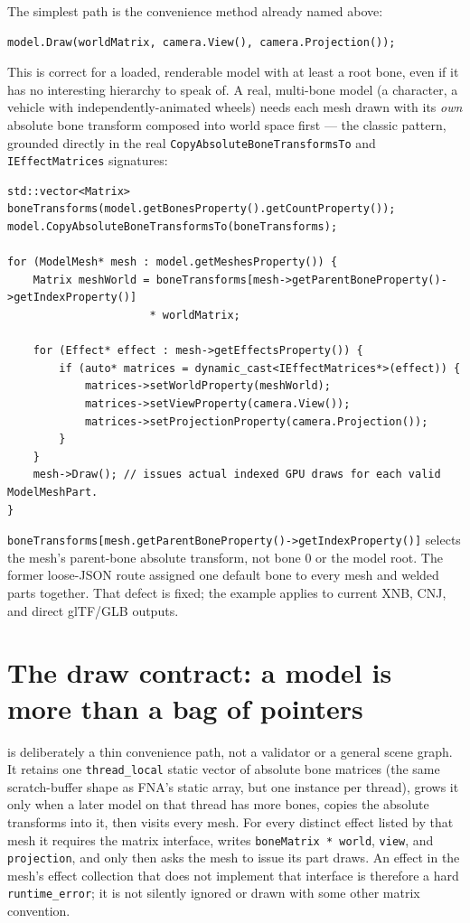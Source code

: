 The simplest path is the convenience method already named above:

\begin{lstlisting}
model.Draw(worldMatrix, camera.View(), camera.Projection());
\end{lstlisting}

This is correct for a loaded, renderable model with at least a root bone, even if it has no
interesting hierarchy to speak of. A real, multi-bone model
(a character, a vehicle with independently-animated wheels) needs each mesh drawn with its
\emph{own} absolute bone transform composed into world space first --- the classic pattern,
grounded directly in the real \texttt{CopyAbsoluteBoneTransformsTo} and
\texttt{IEffectMatrices} signatures:

\begin{lstlisting}
std::vector<Matrix> boneTransforms(model.getBonesProperty().getCountProperty());
model.CopyAbsoluteBoneTransformsTo(boneTransforms);

for (ModelMesh* mesh : model.getMeshesProperty()) {
    Matrix meshWorld = boneTransforms[mesh->getParentBoneProperty()->getIndexProperty()]
                      * worldMatrix;

    for (Effect* effect : mesh->getEffectsProperty()) {
        if (auto* matrices = dynamic_cast<IEffectMatrices*>(effect)) {
            matrices->setWorldProperty(meshWorld);
            matrices->setViewProperty(camera.View());
            matrices->setProjectionProperty(camera.Projection());
        }
    }
    mesh->Draw(); // issues actual indexed GPU draws for each valid ModelMeshPart.
}
\end{lstlisting}

\texttt{boneTransforms[mesh.getParentBoneProperty()->getIndexProperty()]} selects the mesh's
parent-bone absolute transform, not bone 0 or the model root. The former loose-JSON route assigned
one default bone to every mesh and welded parts together. That defect is fixed; the example applies
to current XNB, CNJ, and direct glTF/GLB outputs.

\section{The draw contract: a model is more than a bag of pointers}
\label{sec:model-draw-contract}

 is deliberately a thin convenience path, not a validator or a general
scene graph. It retains one \texttt{thread\_local} static vector of absolute bone matrices (the
same scratch-buffer shape as FNA's static array, but one instance per thread), grows it only
when a later model on that thread has more bones, copies the
absolute transforms into it, then visits every mesh. For every distinct effect listed by that
mesh it requires the matrix interface, writes
\texttt{boneMatrix * world}, \texttt{view}, and \texttt{projection}, and only then asks the mesh
to issue its part draws. An effect in the mesh's effect collection that does not implement that
interface is therefore a hard \texttt{runtime\_error}; it is not silently ignored or drawn with
some other matrix convention.

